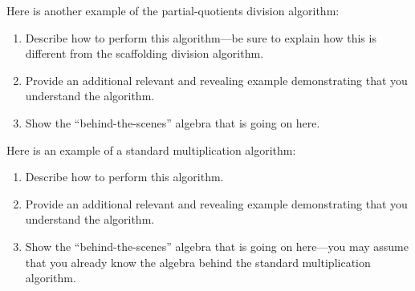 \documentclass[nooutcomes]{ximera}
\begin{document}
\begin{problem}Here is another example of the partial-quotients division
  algorithm:
\begin{image}
\end{image}
\begin{enumerate}
\item Describe how to perform this algorithm---be sure to explain how
  this is different from the scaffolding division algorithm.
\item Provide an additional relevant and revealing example
  demonstrating that you understand the algorithm.
\item Show the ``behind-the-scenes'' algebra that is going on here.
\end{enumerate}
\end{problem} 

\begin{problem}Here is an example of a standard multiplication
  algorithm:
\begin{image}
\end{image}
\begin{enumerate}
\item Describe how to perform this algorithm.
\item Provide an additional relevant and revealing example
  demonstrating that you understand the algorithm.
\item Show the ``behind-the-scenes'' algebra that is going on
  here---you may assume that you already know the algebra behind the 
standard multiplication algorithm.
\end{enumerate}
\end{problem} 
\end{document}
